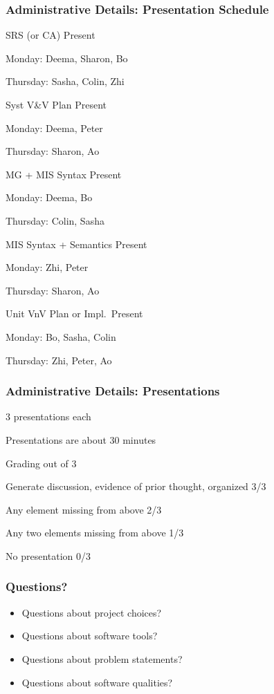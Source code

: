 \documentclass[t,12pt,numbers,fleqn]{beamer}
\begin{document}

\begin{frame}
\frametitle{Administrative Details: Presentation Schedule}

\bi
\item SRS (or CA) Present
\bi
\item Monday: Deema, Sharon, Bo
\item Thursday: Sasha, Colin, Zhi
\ei
\item Syst V\&V Plan Present
\bi
\item Monday: Deema, Peter
\item Thursday: Sharon, Ao
\ei
\item MG + MIS Syntax Present
\bi
\item Monday:  Deema, Bo
\item Thursday: Colin, Sasha
\ei
\item MIS Syntax + Semantics Present
\bi
\item Monday: Zhi, Peter
\item Thursday:  Sharon, Ao
\ei
\item Unit VnV Plan or Impl.\ Present
\bi
\item Monday: Bo, Sasha, Colin
\item Thursday: Zhi, Peter, Ao
\ei

\ei

\end{frame}


\begin{frame}
\frametitle{Administrative Details: Presentations}

\bi
\item 3 presentations each
\item Presentations are about 30 minutes
\item Grading out of 3
\bi
\item Generate discussion, evidence of prior thought, organized 3/3
\item Any element missing from above 2/3
\item Any two elements missing from above 1/3
\item No presentation 0/3
\ei
\ei

\end{frame}


\begin{frame}
\frametitle{Questions?}
\begin{itemize}
\item Questions about project choices?
\item Questions about software tools?
\item Questions about problem statements?
\item Questions about software qualities?
\end{itemize}
\end{frame}
\end{document}
